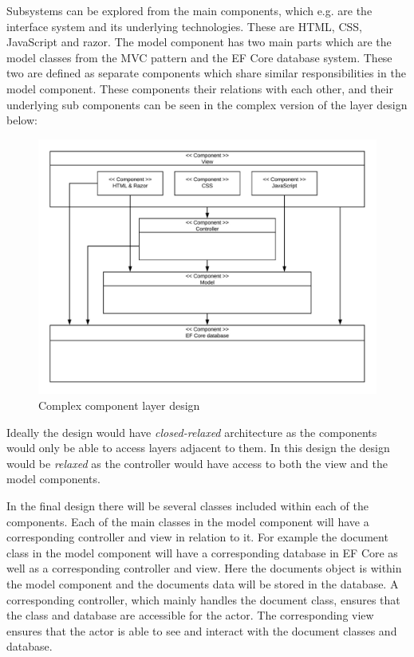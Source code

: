 \documentclass[../../master.tex]{subfiles}
\begin{document}
Subsystems can be explored from the main components, which e.g. are the interface system and its underlying technologies.
These are HTML, CSS, JavaScript and razor.
The model component has two main parts which are the model classes from the MVC pattern and the EF Core database system.
These two are defined as separate components which share similar responsibilities in the model component.
These components their relations with each other, and their underlying sub components can be seen in the complex version of the layer design below:

\begin{figure}[H]
	\centering
	\includegraphics[width=1\textwidth]{billeder/complexcomponents.jpeg}
	\caption{Complex component layer design}
\end{figure}

Ideally the design would have \textit{closed-relaxed} architecture as the components would only be able to access layers adjacent to them.
In this design the design would be \textit{relaxed} as the controller would have access to both the view and the model components.

In the final design there will be several classes included within each of the components.
Each of the main classes in the model component will have a corresponding controller and view in relation to it.
For example the document class in the model component will have a corresponding database in EF Core as well as a corresponding controller and view.
Here the documents object is within the model component and the documents data will be stored in the database.
A corresponding controller, which mainly handles the document class, ensures that the class and database are accessible for the actor.
The corresponding view ensures that the actor is able to see and interact with the document classes and database.
\end{document}
